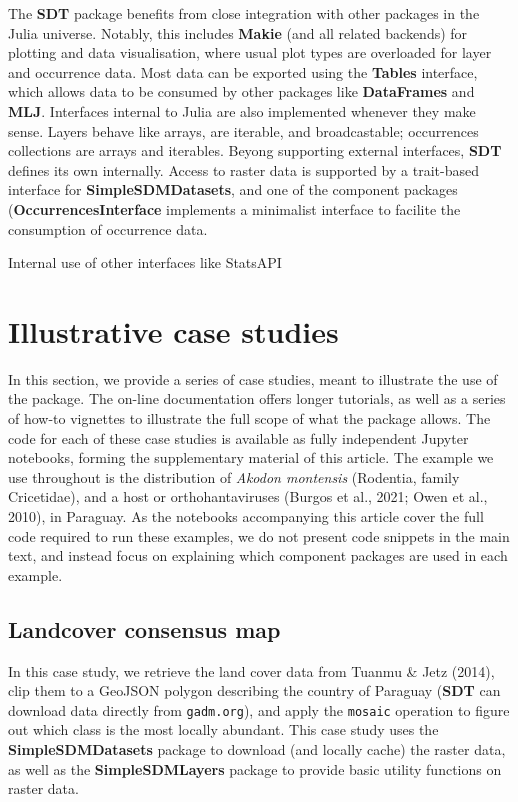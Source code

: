 \documentclass[
]{article}
\begin{document}
The \textbf{SDT} package benefits from close integration with other
packages in the Julia universe. Notably, this includes \textbf{Makie}
(and all related backends) for plotting and data visualisation, where
usual plot types are overloaded for layer and occurrence data. Most data
can be exported using the \textbf{Tables} interface, which allows data
to be consumed by other packages like \textbf{DataFrames} and
\textbf{MLJ}. Interfaces internal to Julia are also implemented whenever
they make sense. Layers behave like arrays, are iterable, and
broadcastable; occurrences collections are arrays and iterables. Beyong
supporting external interfaces, \textbf{SDT} defines its own internally.
Access to raster data is supported by a trait-based interface for
\textbf{SimpleSDMDatasets}, and one of the component packages
(\textbf{OccurrencesInterface} implements a minimalist interface to
facilite the consumption of occurrence data.

Internal use of other interfaces like StatsAPI

\section{Illustrative case studies}\label{illustrative-case-studies}

In this section, we provide a series of case studies, meant to
illustrate the use of the package. The on-line documentation offers
longer tutorials, as well as a series of how-to vignettes to illustrate
the full scope of what the package allows. The code for each of these
case studies is available as fully independent Jupyter notebooks,
forming the supplementary material of this article. The example we use
throughout is the distribution of \emph{Akodon montensis} (Rodentia,
family Cricetidae), and a host or orthohantaviruses (Burgos et al.,
2021; Owen et al., 2010), in Paraguay. As the notebooks accompanying
this article cover the full code required to run these examples, we do
not present code snippets in the main text, and instead focus on
explaining which component packages are used in each example.

\subsection{Landcover consensus map}\label{landcover-consensus-map}

In this case study, we retrieve the land cover data from Tuanmu \& Jetz
(2014), clip them to a GeoJSON polygon describing the country of
Paraguay (\textbf{SDT} can download data directly from
\texttt{gadm.org}), and apply the \texttt{mosaic} operation to figure
out which class is the most locally abundant. This case study uses the
\textbf{SimpleSDMDatasets} package to download (and locally cache) the
raster data, as well as the \textbf{SimpleSDMLayers} package to provide
basic utility functions on raster data.
\end{document}
